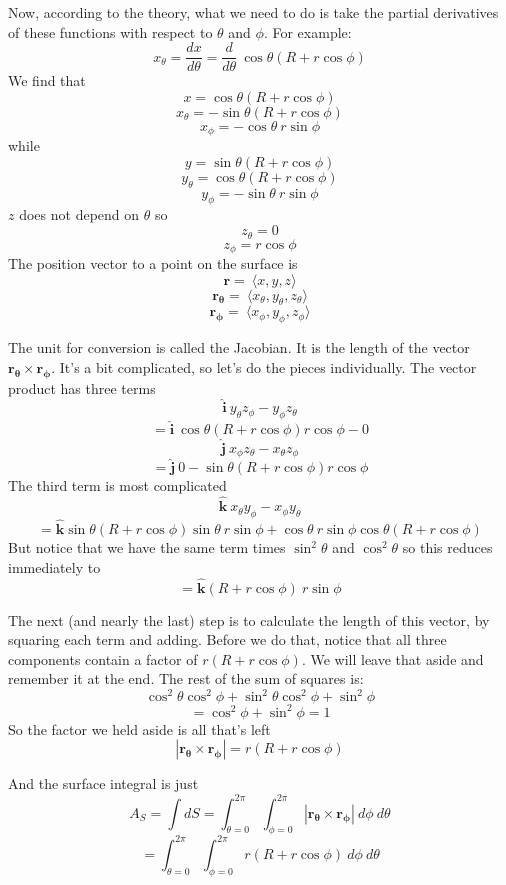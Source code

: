 \documentclass[11pt, oneside]{article}   	%
\begin{document}
Now, according to the theory, what we need to do is take the partial derivatives of these functions with respect to $\theta$ and $\phi$.  For example:
\[ x_{\theta} = \frac{dx}{d \theta} = \frac{d}{d \theta} \ \cos \theta (R + r \cos \phi) \]
We find that
\[ x = \cos \theta (R + r \cos \phi) \]
\[ x_{\theta} = -\sin \theta (R + r \cos \phi) \]
\[ x_{\phi} = -\cos \theta \ r \sin \phi \]
while
\[ y = \sin \theta (R  + r \cos \phi) \]
\[ y_{\theta} = \cos \theta (R + r \cos \phi) \]
\[ y_{\phi} = -\sin \theta \ r \sin \phi \]
$z$ does not depend on $\theta$ so
\[ z_{\theta} = 0 \]
\[ z_{\phi} = r \cos \phi \]
The position vector to a point on the surface is
\[ \mathbf{r} = \ \langle x,y,z \rangle \]
\[ \mathbf{r_{\theta}} = \ \langle x_{\theta},y_{\theta},z_{\theta} \rangle \]
\[ \mathbf{r_{\phi}} = \ \langle x_{\phi},y_{\phi},z_{\phi} \rangle \]

The unit for conversion is called the Jacobian.  It is the length of the vector $\mathbf{r_{\theta}} \times \mathbf{r_{\phi}}$.  It's a bit complicated, so let's do the pieces individually.  The vector product has three terms
\[ \hat{\mathbf{i}} \ y_{\theta} z_{\phi} -  y_{\phi} z_{\theta} \]
\[ = \hat{\mathbf{i}} \  \cos \theta (R + r \cos \phi) r \cos \phi - 0 \]
\[ \hat{\mathbf{j}} \ x_{\phi} z_{\theta} -  x_{\theta} z_{\phi} \]
\[ = \hat{\mathbf{j}} \  0 - \sin \theta (R + r \cos \phi) r \cos \phi  \]
The third term is most complicated
\[ \hat{\mathbf{k}} \ x_{\theta} y_{\phi} -  x_{\phi} y_{\theta} \]
\[ = \hat{\mathbf{k}} \sin \theta (R + r \cos \phi) \sin \theta \ r \sin \phi + \cos \theta \ r \sin \phi \cos \theta (R + r \cos \phi) \]
But notice that we have the same term times $\sin^2 \theta$ and $\cos^2 \theta$ so this reduces immediately to 
\[ = \hat{\mathbf{k}}  (R + r \cos \phi) \ r \sin \phi \]

The next (and nearly the last) step is to calculate the length of this vector, by squaring each term and adding.  Before we do that, notice that all three components contain a factor of $r (R + r \cos \phi)$.  We will leave that aside and remember it at the end.  The rest of the sum of squares is:
\[ \cos^2 \theta \cos^2 \phi + \sin^2 \theta \cos^2 \phi + \sin^2 \phi   \]
\[ = \cos^2 \phi + \sin^2 \phi  = 1 \]
So the factor we held aside is all that's left
\[ |\mathbf{r_{\theta}} \times \mathbf{r_{\phi}} | = r (R + r \cos \phi) \]

And the surface integral is just
\[ A_S = \int dS = \int_{\theta = 0}^{2 \pi} \int_{\phi = 0}^{2 \pi} |\mathbf{r_{\theta}} \times \mathbf{r_{\phi}}| \ d \phi \ d \theta \]
\[ = \int_{\theta = 0}^{2 \pi} \int_{\phi = 0}^{2 \pi} r (R + r \cos \phi) \ d \phi \ d \theta \]
\end{document}
